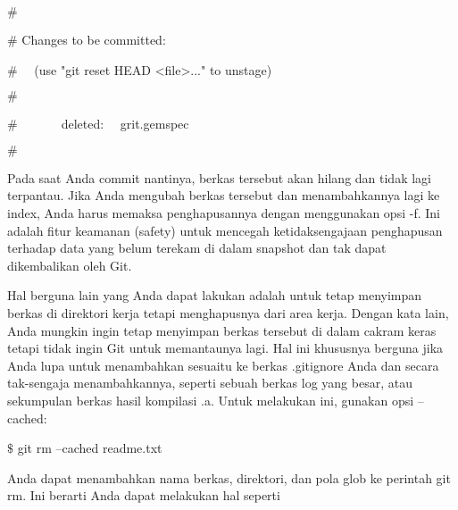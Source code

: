 \noindent 
{\fontsize{14pt}{14pt}\selectfont  $  \#  $ \\} \par
\noindent 
{\fontsize{14pt}{14pt}\selectfont  $  \#  $ Changes to be committed: \\} \par
\noindent 
{\fontsize{14pt}{14pt}\selectfont  $  \#  $~~ (use "git reset HEAD <file>..." to unstage) \\} \par
\noindent 
{\fontsize{14pt}{14pt}\selectfont  $  \#  $ \\} \par
\noindent 
{\fontsize{14pt}{14pt}\selectfont  $  \#  $~~~~~~~deleted:~~  grit.gemspec \\} \par
\noindent 
{\fontsize{14pt}{14pt}\selectfont  $  \#  $ \\} \par
\noindent 
{\fontsize{14pt}{14pt}\selectfont Pada saat Anda commit nantinya, berkas tersebut akan hilang dan tidak lagi terpantau. Jika Anda mengubah berkas tersebut dan menambahkannya lagi ke index, Anda harus memaksa penghapusannya dengan menggunakan opsi $  $-f. Ini adalah fitur keamanan (safety) untuk mencegah ketidaksengajaan penghapusan terhadap data yang belum terekam di dalam snapshot dan tak dapat dikembalikan oleh Git. \\} \par
\noindent 
{\fontsize{14pt}{14pt}\selectfont Hal berguna lain yang Anda dapat lakukan adalah untuk tetap menyimpan berkas di direktori kerja tetapi menghapusnya dari area kerja. Dengan kata lain, Anda mungkin ingin tetap menyimpan berkas tersebut di dalam cakram keras tetapi tidak ingin Git untuk memantaunya lagi. Hal ini khususnya berguna jika Anda lupa untuk menambahkan sesuaitu ke berkas $  $.gitignore $  $Anda dan secara tak-sengaja menambahkannya, seperti sebuah berkas log yang besar, atau sekumpulan berkas hasil kompilasi $  $.a. Untuk melakukan ini, gunakan opsi $  $--cached: \\} \par
\noindent 
{\fontsize{14pt}{14pt}\selectfont  $  \$  $ git rm --cached readme.txt \\} \par
\noindent 
{\fontsize{14pt}{14pt}\selectfont Anda dapat menambahkan nama berkas, direktori, dan pola glob ke perintah $  $git rm. Ini berarti Anda dapat melakukan hal seperti \\} \par
